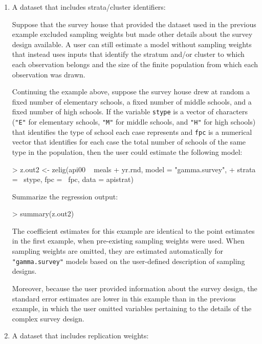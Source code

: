 \begin{enumerate}
\item  A dataset that includes strata/cluster identifiers:

Suppose that the survey house that provided the dataset used in the
previous example excluded sampling weights but made other details
about the survey design available.  A user can still estimate a model
without sampling weights that instead uses inputs that identify the
stratum and/or cluster to which each observation belongs and the
size of the finite population from which each observation was drawn.

Continuing the example above, suppose the survey house drew at
random a fixed number of elementary schools, a fixed number of
middle schools, and a fixed number of high schools. If the variable
{\tt stype} is a vector of characters ({\tt "E"} for elementary
schools, {\tt "M"} for middle schools, and {\tt "H"} for high schools)
that identifies the type of school each case
represents and {\tt fpc} is a numerical vector that identifies for
each case the total number of schools of the same type in the
population, then the user could estimate the following model:

\begin{Schunk}
\begin{Sinput}
> z.out2 <- zelig(api00 ~ meals + yr.rnd, model = "gamma.survey", 
+     strata = ~stype, fpc = ~fpc, data = apistrat)
\end{Sinput}
\end{Schunk}
Summarize the regression output:
\begin{Schunk}
\begin{Sinput}
> summary(z.out2)
\end{Sinput}
\end{Schunk}
The coefficient estimates for this example are
identical to the point estimates in the first example, when
pre-existing sampling weights were used.  When sampling weights are
omitted, they are estimated automatically for {\tt "gamma.survey"}
models based on the user-defined description of sampling designs. 

Moreover, because the user provided information about the survey
design, the standard error estimates are lower in this example than
in the previous example, in which the user omitted variables pertaining
to the details of the complex survey design.

\item A dataset that includes replication weights:


\end{enumerate}
